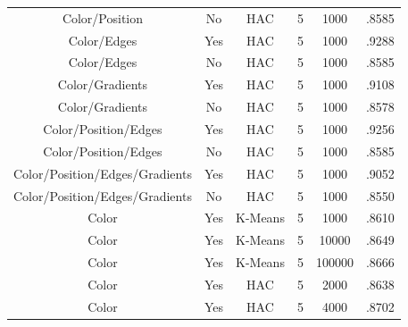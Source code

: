\documentclass[12pt]{article}
\begin{document}
\begin{table}[H]
\begin{adjustbox}{width=\columnwidth,center}
\begin{tabular}{c c c c c c}
			Color/Position & No & HAC & 5 & 1000 & .8585 \\
			Color/Edges & Yes & HAC & 5 & 1000 & .9288 \\
			Color/Edges & No & HAC & 5 & 1000 & .8585 \\
			Color/Gradients & Yes & HAC & 5 & 1000 & .9108 \\
			Color/Gradients & No & HAC & 5 & 1000 & .8578 \\
			Color/Position/Edges & Yes & HAC & 5 & 1000 & .9256 \\
			Color/Position/Edges & No & HAC & 5 & 1000 & .8585 	\\
			Color/Position/Edges/Gradients & Yes & HAC & 5 & 1000 & .9052 \\
			Color/Position/Edges/Gradients & No & HAC & 5 & 1000 & .8550 \\
			Color & Yes & K-Means & 5 & 1000 & .8610 \\
			Color & Yes & K-Means & 5 & 10000 & .8649 \\
			Color & Yes & K-Means & 5 & 100000 & .8666 \\
			Color & Yes & HAC & 5 & 2000 & .8638 \\
			Color & Yes & HAC & 5 & 4000 & .8702 \\
		\end{tabular}
	\end{adjustbox}
\end{table}
\end{document}
